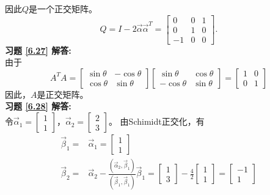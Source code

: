 因此$Q$是一个正交矩阵。
\begin{equation*}
Q=I-2\vec{\alpha}\vec{\alpha}^T
   =\begin{bmatrix}0&0&1\\0&1&0\\-1&0&0\end{bmatrix}.
\end{equation*}
\textbf{习题 \ref{6.27} 解答:}\\
由于
\begin{equation*}
 A^TA= \begin{bmatrix}\sin\theta&-\cos\theta\\ \cos\theta&\sin\theta\end{bmatrix}
 \begin{bmatrix}\sin\theta&\cos\theta\\-\cos\theta&\sin\theta\end{bmatrix}
 =\begin{bmatrix}1&0\\0&1\end{bmatrix}
\end{equation*}
因此，$A$是正交矩阵。\\
\textbf{习题 \ref{6.28} 解答:}\\
令$\vec{\alpha}_1=\begin{bmatrix}1\\1\end{bmatrix}$，$\vec{\alpha}_2=\begin{bmatrix}2\\3\end{bmatrix}$。
由Schimidt正交化，有\\
\begin{align*}
\vec{\beta}_1=&\vec{\alpha}_1=\begin{bmatrix}1\\1\end{bmatrix}\\
\vec{\beta}_2=&\vec{\alpha}_2-\frac{(\vec{\alpha}_2,\vec{\beta}_1)}{(\vec{\beta}_1,\vec{\beta}_1)}\vec{\beta}_1
             =\begin{bmatrix}1\\3\end{bmatrix}-\frac{4}{2}\begin{bmatrix}1\\1\end{bmatrix}=\begin{bmatrix}-1\\1\end{bmatrix}
\end{align*}
